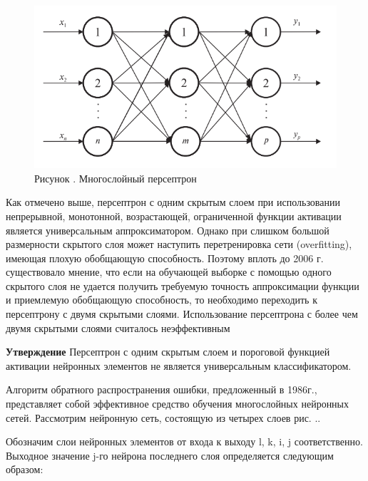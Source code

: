 	\begin{figure}[H]
		\centering
		\def\svgwidth{\textwidth}
		\includegraphics[scale=1.2]{images/one_hidden_perceptron.png}
		\caption*{\gostFont Рисунок \thechaptercntr .\theimagecntr \spc {--} Многослойный персептрон}
	\end{figure}  \addtocounter{imagecntr}{1}
	
	\par \redline Как отмечено выше, персептрон с одним скрытым слоем при использовании непрерывной, монотонной, возрастающей, ограниченной
	функции активации является универсальным аппроксиматором. Однако
	при слишком большой размерности скрытого слоя может наступить
	перетренировка сети (overfitting), имеющая плохую обобщающую способность. Поэтому вплоть до 2006 г. существовало мнение, что если на
	обучающей выборке с помощью одного скрытого слоя не удается получить требуемую точность аппроксимации функции и приемлемую
	обобщающую способность, то необходимо переходить к персептрону с
	двумя скрытыми слоями. Использование персептрона с более чем двумя скрытыми слоями считалось неэффективным
	
	\par \redline \textbf{Утверждение} Персептрон с одним скрытым слоем и пороговой
	функцией активации нейронных элементов не является универсальным
	классификатором.
	
	\par \redline Алгоритм обратного распространения ошибки, предложенный в 1986г., представляет собой эффективное средство обучения многослойных нейронных сетей. Рассмотрим нейронную сеть, состоящую из четырех слоев рис. \thechaptercntr.\theimagecntr.
	
	\par \redline Обозначим слои нейронных элементов от входа к выходу l, k, i, j соответственно. Выходное значение j-го нейрона последнего слоя определяется следующим образом:
	
